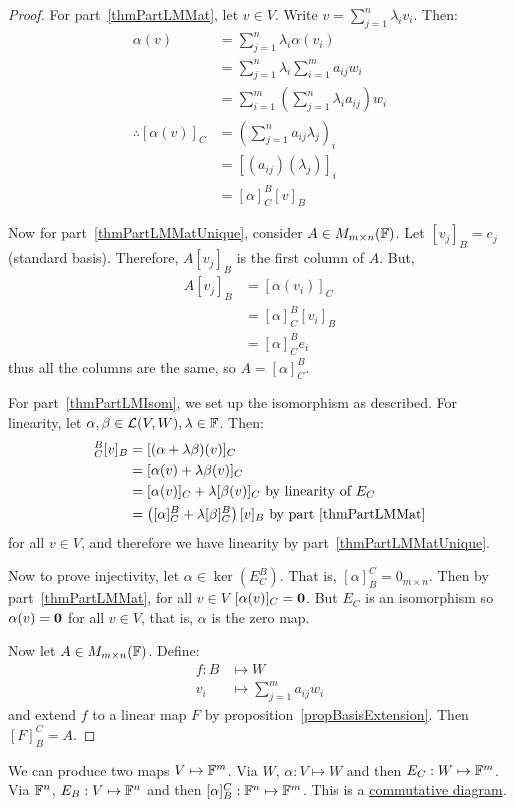\documentclass[../Main.tex]{subfiles}
\begin{document}
\begin{proof}
    For part~\ref{thmPartLMMat}, let $v \in V$. Write $v = \sum_{j=1}^n \lambda_i v_i$. Then:
    \begin{align*}
        \alpha(v) &= \sum_{j=1}^{n}\lambda_i \alpha(v_i) \\
        &= \sum_{j=1}^{n}\lambda_i \sum_{i=1}^{m} a_{ij} w_i \\
        &= \sum_{i=1}^{m} \left(\sum_{j=1}^{n}\lambda_i a_{ij}\right)w_i \\
        \therefore [\alpha(v)]_C &= \left(\sum_{j=1}^{n}a_{ij}\lambda_j\right)_i \\
        &= [(a_{ij})(\lambda_j)]_i \\
        &= [\alpha]_C^B [v]_B
    \end{align*}

    Now for part~\ref{thmPartLMMatUnique}, consider $A \in M_{m \times n}(\mathbb{F})$. Let $[v_j]_B = e_j$ (standard basis). Therefore, $A[v_j]_B$ is the first column of $A$. But,
    \begin{align*}
        A[v_j]_B &= [\alpha(v_i)]_C \\
        &= [\alpha]_C^B [v_i]_B \\
        &= [\alpha]_C^B e_i
    \end{align*}
    thus all the columns are the same, so $A = [\alpha]_C^B$.

    For part~\ref{thmPartLMIsom}, we set up the isomorphism as described.
    For linearity, let $\alpha, \beta \in \mathcal{L}(V, W), \lambda \in \mathbb{F}$. Then:
    \begin{align*}
        [\alpha + \lambda\beta]_C^B [v]_B &= [(\alpha + \lambda\beta)(v)]_C \\
        &= [\alpha(v) + \lambda\beta(v)]_C \\
        &= [\alpha(v)]_C + \lambda[\beta(v)]_C \text{ by linearity of } E_C \\
        &= \left([\alpha]_C^B + \lambda[\beta]_C^B\right)[v]_B \text{ by part~\ref{thmPartLMMat}} 
    \end{align*}
    for all $v \in V$, and therefore we have linearity by part~\ref{thmPartLMMatUnique}.

    Now to prove injectivity, let $\alpha \in \ker(E_C^B)$. That is, $[\alpha]_B^C = 0_{m \times n}$. Then by part~\ref{thmPartLMMat}, for all $v \in V$ $[\alpha(v)]_C = \boldsymbol{0}$. But $E_C$ is an isomorphism so $\alpha(v) = \boldsymbol{0}$ for all $v \in V$, that is, $\alpha$ is the zero map.

    Now let $A \in M_{m \times n}(\mathbb{F})$. Define:
    \begin{align*}
        f : B &\mapsto W\\
        v_i &\mapsto \sum_{j=1}^{m}a_{ij}w_i
    \end{align*}
    and extend $f$ to a linear map $F$ by proposition~\ref{propBasisExtension}. Then $[F]_B^C = A$.
\end{proof}
\begin{remark}
    We can produce two maps $V \mapsto \mathbb{F}^m$. Via $W$, $\alpha : V \mapsto W$ and then $E_C : W \mapsto \mathbb{F}^m$. Via $\mathbb{F}^n$, $E_B : V \mapsto \mathbb{F}^n$ and then $[\alpha]_B^C : \mathbb{F}^n \mapsto \mathbb{F}^m$. This is a \underline{commutative diagram}.
\end{remark}
\end{document}
